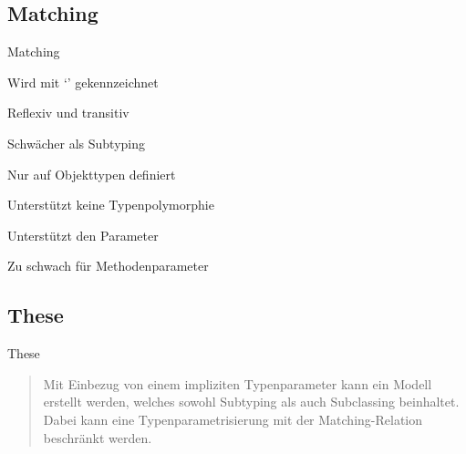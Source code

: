 \subsection{Matching}
\begin{frame}{Matching}
	\begin{bigitemize}[<+->]{3mm}
		\item Wird mit `\match' gekennzeichnet

		\item Reflexiv und transitiv

		\item Schwächer als Subtyping

		\item Nur auf Objekttypen definiert

		\item Unterstützt keine Typenpolymorphie

		\item Unterstützt den \mytype Parameter

		\item Zu schwach für Methodenparameter
	\end{bigitemize}
\end{frame}

\subsection{These}
\begin{frame}[c]{These}
	\begin{quote}
	Mit Einbezug von einem impliziten Typenparameter kann ein Modell
	erstellt werden, welches sowohl Subtyping als auch Subclassing
	beinhaltet. Dabei kann eine Typenparametrisierung mit der
	Matching-Relation beschränkt werden.
	\end{quote}
\end{frame}
